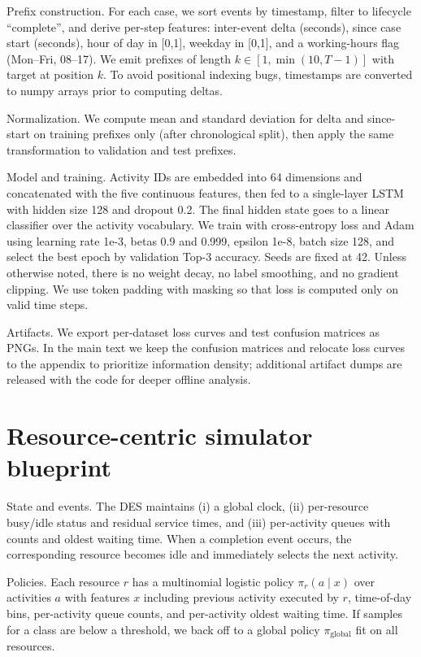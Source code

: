 \documentclass{article}
\theoremstyle{plain}
\theoremstyle{definition}
\theoremstyle{remark}
\begin{document}
	Prefix construction. For each case, we sort events by timestamp, filter to lifecycle ``complete'', and derive per-step features: inter-event delta (seconds), since case start (seconds), hour of day in [0,1], weekday in [0,1], and a working-hours flag (Mon--Fri, 08--17). We emit prefixes of length $k\in[1,\min(10,T-1)]$ with target at position $k$. To avoid positional indexing bugs, timestamps are converted to numpy arrays prior to computing deltas.
	
	Normalization. We compute mean and standard deviation for delta and since-start on training prefixes only (after chronological split), then apply the same transformation to validation and test prefixes.
	
	Model and training. Activity IDs are embedded into 64 dimensions and concatenated with the five continuous features, then fed to a single-layer LSTM with hidden size 128 and dropout 0.2. The final hidden state goes to a linear classifier over the activity vocabulary. We train with cross-entropy loss and Adam using learning rate 1e-3, betas 0.9 and 0.999, epsilon 1e-8, batch size 128, and select the best epoch by validation Top-3 accuracy. Seeds are fixed at 42. Unless otherwise noted, there is no weight decay, no label smoothing, and no gradient clipping. We use token padding with masking so that loss is computed only on valid time steps.
	
	Artifacts. We export per-dataset loss curves and test confusion matrices as PNGs. In the main text we keep the confusion matrices and relocate loss curves to the appendix to prioritize information density; additional artifact dumps are released with the code for deeper offline analysis.
	
	\section{Resource-centric simulator blueprint}
	State and events. The DES maintains (i) a global clock, (ii) per-resource busy/idle status and residual service times, and (iii) per-activity queues with counts and oldest waiting time. When a completion event occurs, the corresponding resource becomes idle and immediately selects the next activity.
	
	Policies. Each resource $r$ has a multinomial logistic policy $\pi_r(a\mid x)$ over activities $a$ with features $x$ including previous activity executed by $r$, time-of-day bins, per-activity queue counts, and per-activity oldest waiting time. If samples for a class are below a threshold, we back off to a global policy $\pi_{\mathrm{global}}$ fit on all resources.
	
\end{document}
